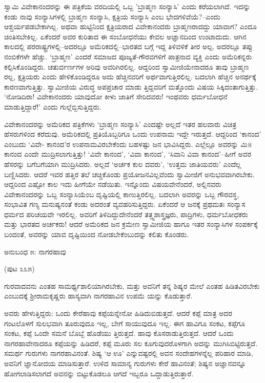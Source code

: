 ಸ್ವಾಮಿ ವಿವೇಕಾನಂದರನ್ನು ಈ ಪತ್ರಿಕೆಯ ವರದಿಯಲ್ಲಿ ಒಬ್ಬ 'ಬ್ರಾಹ್ಮಣ ಸಂನ್ಯಾಸಿ' ಎಂದು ಕರೆಯಲಾಗಿದೆ. ಇದನ್ನು ಕಂಡು ನಾವು ಸಂನ್ಯಾಸಿಗಳಲ್ಲಿ ಬ್ರಾಹ್ಮಣ ಸಂನ್ಯಾಸಿ, ಕ್ಷತ್ರಿಯ ಸಂನ್ಯಾಸಿ ಎಂಬ ಭೇದಗಳಿವೆಯೆ?–ಎಂದು ಆಶ್ಚರ್ಯಪಡಬೇಕಾಗಿಲ್ಲ. ಅಥವಾ ಹುಟ್ಟಿನಿಂದ ಕ್ಷತ್ರಿಯರಾದ ವಿವೇಕಾನಂದರು ಬ್ರಾಹ್ಮಣರಾದದ್ದು ಯಾವಾಗ? ಎಂದೂ ಚಿಂತಿಸಬೇಕಿಲ್ಲ. ಏಕೆಂದರೆ ಅವರ ಕುರಿತಾದ ಈ ಸಂಬೋಧನೆಯು ಕೇವಲ ಅಜ್ಞಾನದಿಂದ ಉಂಟಾದುದು. ಆಗಿನ ಕಾಲದಲ್ಲಿ ಪರರಾಷ್ಟ್ರಗಳಲ್ಲಿ–ಅದರಲ್ಲೂ ಅಮೆರಿಕದಲ್ಲಿ–ಭಾರತದ ಬಗ್ಗೆ ಇದ್ದ ತಿಳಿವಳಿಕೆ ತೀರ ಅಲ್ಪ. ಅದರಲ್ಲೂ ತಪ್ಪು ನಂಬಿಕೆಗಳೇ ಹೆಚ್ಚು. ‘ಬ್ರಾಹ್ಮಣ’ ಎಂದರೆ ಸಮಾಜದ ಪೂಜ್ಯತೆ-ಗೌರವಗಳಿಗೆ ಪಾತ್ರನಾದ ವ್ಯಕ್ತಿ ಎಂದು ಅಮೆರಿಕನ್ನರು ಕಲ್ಪಿಸಿಕೊಂಡಿದ್ದರು. ಚತುರ್ವರ್ಣಗಳ ಅರಿವು ಅವರಿಗಿರಲಿಲ್ಲ. ಆದ್ದರಿಂದ ಸ್ವಾಮೀಜಿಯೇನಾದರೂ ತಾವು ಬ್ರಾಹ್ಮಣ ರಲ್ಲ, ಕ್ಷತ್ರಿಯರು ಎಂದು ಹೇಳಿಕೊಂಡಿದ್ದರೂ ಅದು ಹೆಚ್ಚಿನವರಿಗೆ ಅರ್ಥವಾಗುತ್ತಿರಲಿಲ್ಲ. ಬದಲಾಗಿ ಹೆಚ್ಚಿನ ಅನರ್ಥಕ್ಕೆ ಕಾರಣವಾಗುತ್ತಿತ್ತು. ಸ್ವಾಮೀಜಿಯ ವಿರುದ್ಧ ಅಪಪ್ರಚಾರ ಮಾಡು ತ್ತಿದ್ದವರಿಗೆ ಮತ್ತೊಂದು ವಿಷಯ ಸಿಕ್ಕಿದಂತಾಗುತ್ತಿತ್ತು. ‘ನೋಡಿದಿರಾ! ವಿವೇಕಾನಂದರು ಯಾವುದೋ ಕೀಳು ಜಾತಿಗೆ ಸೇರಿದವರು! ಇಂಥವರು ಧರ್ಮಬೋಧನೆ ಮಾಡುತ್ತಿದ್ದಾರೆ!’ ಎಂದು ಗುಲ್ಲೆಬ್ಬಿಸುತ್ತಿದ್ದರು.

ವಿವೇಕಾನಂದರನ್ನು ಅಮೆರಿಕದ ಪತ್ರಿಕೆಗಳು ‘ಬ್ರಾಹ್ಮಣ ಸಂನ್ಯಾಸಿ’ ಎಂದಷ್ಟೇ ಅಲ್ಲದೆ ಇತರ ಹಲವಾರು ವಿಚಿತ್ರ ಹೆಸರುಗಳಿಂದ ಕರೆದುವು. ಅಮೆರಿಕದಲ್ಲಿ ಪ್ರತಿಯೊಬ್ಬರಿಗೂ ಒಂದು ಉಪನಾಮ  ಇದ್ದೇ ಇರುತ್ತದೆ. ಆದ್ದರಿಂದ ‘ಕಾನಂದ’ ಎಂಬುದು ‘ವಿವೇ- ಕಾನಂದ’ರ ಉಪನಾಮವಿರಬೇಕೆಂದು ಬಹಳಷ್ಟು ಜನ ಭಾವಿಸಿದ್ದರು. ಎಲ್ಲೆಲ್ಲೂ ಅವರನ್ನು ಮಿ॥ ಕಾನಂದ ಎಂದೇ ಮುದ್ರಿಸಲಾಗುತ್ತಿತ್ತು! ‘ವಿವೇ ಕಾನಂದ’, ‘ವಿವಾ ಕಾನಂದ’, ‘ಸಿವಾನಿ ವಿವಾ ಕಾನಂದ’–ಹೀಗೆ ಅವರ ಹೆಸರನ್ನು ಬಗೆಬಗೆಯಾಗಿ ಮುದ್ರಿಸಿದರು. ಅಲ್ಲದೆ ‘ಅರ್ಚಕ ಕುಲ ದವರು’, ‘ಉತ್ತಮ ಜಾತಿಯವರು’ ಎಂದೆಲ್ಲ ಬಣ್ಣಿಸಿದರು. ಆದರೆ ಇವರ ಹತ್ತಿರ ತಲೆ ಚಚ್ಚಿಕೊಂಡು ಪ್ರಯೋಜನವಿಲ್ಲವೆಂದು ಸ್ವಾಮೀಜಿಗೆ ಅನುಭವವಾಗಿರಬೇಕು. ಆದ್ದರಿಂದ ಎಷ್ಟೋ ಕಾಲ ಇದು ಹೀಗೆಯೇ ನಡೆಯಿತು. ಇನ್ನೊಂದು ವಿಷಯವೇನೆಂದರೆ, ಅಲ್ಲಿನವರು ವಿವೇಕಾನಂದರನ್ನು ಒಬ್ಬ ಸಂನ್ಯಾಸಿಯೆಂಬ ದೃಷ್ಟಿಯಲ್ಲಿ ಕಾಣುತ್ತಿರಲಿಲ್ಲ. ಬದಲಾಗಿ ಅವರನ್ನು ಒಬ್ಬ ಗೌರವಸ್ಥ, ಸಂಭಾವಿತ ಗಣ್ಯ ಮನುಷ್ಯನಂತೆ ಕಂಡು ಅದರಂತೆ ವ್ಯವಹರಿಸುತ್ತಿದ್ದರು. ಏಕೆಂದರೆ ಆ ಜನಕ್ಕೆ ಪ್ರಥಮತಃ ಸಂನ್ಯಾಸ ಧರ್ಮದ ಪರಿಚಯವೇ ಇರಲಿಲ್ಲ. ಅವರಿಗೆ ತಿಳಿದಿದ್ದುದೇನೆಂದರೆ ತತ್ತ್ವಶಾಸ್ತ್ರಜ್ಞರು, ಪಾದ್ರಿಗಳು, ಧರ್ಮಬೋಧಕರು ಮತ್ತು ಭಾರತದ ಅರ್ಚಕರು! ಆದರೆ ಅಮೆರಿಕದ ಜನ ಕ್ರಮೇಣ ಸ್ವಾಮೀಜಿಯ ಹಾಗೂ ಇತರ ಸಂನ್ಯಾಸಿಗಳ ಸಂಪರ್ಕಕ್ಕೆ ಬಂದಂತೆ, ಅವರನ್ನು ಯಾವ ದೃಷ್ಟಿಯಿಂದ ನೋಡಬೇಕೆಂಬುದನ್ನು ಕಲಿತು ಕೊಂಡರು.


\begin{center}
ಅನುಬಂಧ ೫: ನಾಗರಹಾವು
\end{center}

\begin{center}
(ಪುಟ ೩೩೫)
\end{center}

ಗುರವಾದವನು ಎಂತಹ ಸಾಮರ್ಥ್ಯಶಾಲಿಯಾಗಿರಬೇಕು, ಮತ್ತು ಅವನಿಗೆ ತನ್ನ ಶಿಷ್ಯರ ಮೇಲೆ ಎಂತಹ ಹಿಡಿತವಿರಬೇಕು ಎಂಬುದಕ್ಕೆ ಶ್ರೀರಾಮಕೃಷ್ಣರು ಹಾಸ್ಯವಾಗಿ ನಾಗರಹಾವಿನ ಉಪಮೆ ಯನ್ನು ಕೊಡುತ್ತಾರೆ.

ಅವರು ಹೇಳುತ್ತಿದ್ದರು: ಒಂದು ಕೇರೆಹಾವು ಕಪ್ಪೆಯನ್ನೇನೋ ಹಿಡಿದುಬಿಡುತ್ತದೆ. ಆದರೆ ಕಪ್ಪೆ ಮಾತ್ರ ಅದರ ಗಂಟಲೊಳಗೆ ಸುಲಭವಾಗಿ ತೂರುವುದೂ ಇಲ್ಲ, ಬೇಗೆ ಸಾಯುವುದೂ ಇಲ್ಲ. ಈಗ ಹಾವಿಗೂ ಸಂಕಟ, ಕಪ್ಪೆಗೂ ಸಂಕಟ, ಕಪ್ಪೆ ಒಂದೇ ಸಮನೆ ಬೊಬ್ಬೆ ಹೊಡೆಯು ತ್ತಿರುತ್ತದೆ. ಹಾವು ಕೊಸರಾಡುತ್ತಿರುತ್ತದೆ. ಆದರೆ ಒಂದು ನಾಗರಹಾವೇನಾದರೂ ಕಪ್ಪೆಯನ್ನು ಹಿಡಿದರೆ, ಕಪ್ಪೆ ಮೂರು ಸಲ ಕೂಗುವುದರೊಳಗಾಗಿ ಅದನ್ನು ಮುಗಿಸಿಬಿಟ್ಟಿರುತ್ತದೆ. ಸಮರ್ಥ ಗುರುಗಳು ನಾಗರಹಾವಿನಂತೆ. ಶಿಷ್ಯ ‘ಆ ಊ’ ಎನ್ನುವಷ್ಟರಲ್ಲಿ ಅವನ ಸಂದೇಹಗಳನ್ನೆಲ್ಲ ಪರಿಹಾರ ಮಾಡಿ, ಅವನಿಗೆ ಜ್ಞಾನೋದಯ ಮಾಡಿಸುತ್ತಾರೆ. ಉಳಿದ ಸಾಮಾನ್ಯ ಗುರುಗಳು ಕೇರೆ ಹಾವಿನಂತೆ; ಶಿಷ್ಯನ ಅಜ್ಞಾನವನ್ನೂ ಹೋಗಲಾಡಿಸಲಾಗದೆ ಅವನನ್ನು ಬಿಟ್ಟುಕೊಡಲೂ ಆಗದೆ ಇಬ್ಬರೂ ಒದ್ದಾಡುತ್ತಿರುತ್ತಾರೆ.

